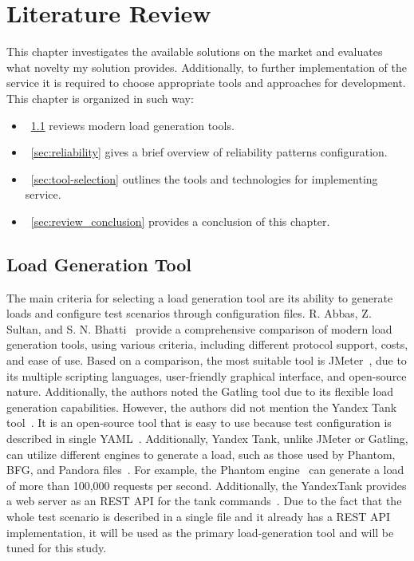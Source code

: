 \chapter{Literature Review}
\label{ch:lr}

This chapter investigates the available solutions on the market and evaluates what novelty my solution provides.
Additionally, to further implementation of the service it is required to choose appropriate tools and approaches for development.
This chapter is organized in such way:

\begin{itemize}
    \item~\ref{sec:load_generation} reviews modern load generation tools.
    \item~\ref{sec:reliability} gives a brief overview of reliability patterns configuration.
    \item~\ref{sec:tool-selection} outlines the tools and technologies for implementing service.
    \item~\ref{sec:review_conclusion} provides a conclusion of this chapter.
\end{itemize}

\section{Load Generation Tool}\label{sec:load_generation}
The main criteria for selecting a load generation tool are its ability to generate loads and configure test scenarios through configuration files.
R. Abbas, Z. Sultan, and S. N. Bhatti~\cite{load_testing_tools} provide a comprehensive comparison of modern load generation tools, using various criteria, including different protocol support, costs, and ease of use.
Based on a comparison, the most suitable tool is JMeter~\cite{jmeter}, due to its multiple scripting languages, user-friendly graphical interface, and open-source nature. Additionally, the authors noted the Gatling tool due to its flexible load generation capabilities. However, the authors did not mention the Yandex Tank tool~\cite{yandex_tank}. It is an open-source tool that is easy to use because test configuration is described in single YAML~\cite{yaml}. Additionally, Yandex Tank, unlike JMeter or Gatling, can utilize different engines to generate a load, such as those used by Phantom, BFG, and Pandora files~\cite{load_testing_tools_rus}. For example, the Phantom engine~\cite{phantom} can generate a load of more than 100,000 requests per second.
Additionally, the YandexTank provides a web server as an REST API for the tank commands~\cite{yandex_tank_api}.
Due to the fact that the whole test scenario is described in a single file and it already has a REST API implementation, it will be used as the primary load-generation tool and will be tuned for this study.

